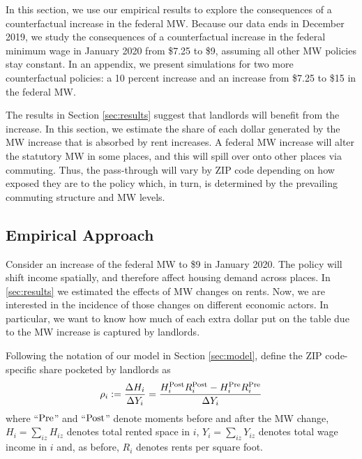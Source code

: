 
In this section, we use our empirical results to explore the consequences of 
a counterfactual increase in the federal MW.
Because our data ends in December 2019, we study the consequences of a 
counterfactual increase in the federal minimum wage in January 2020 from 
\$7.25 to \$9, assuming all other MW policies stay constant. 
In an appendix, we present simulations for two more counterfactual policies: 
a 10 percent increase and an increase from \$7.25 to \$15 in the federal MW.

The results in Section \ref{sec:results} suggest that landlords will benefit
from the increase. 
In this section, we estimate the share of each dollar generated by the MW 
increase that is absorbed by rent increases.
A federal MW increase will alter the statutory MW in some places, and this will
spill over onto other places via commuting.
Thus, the pass-through will vary by ZIP code depending on how exposed they
are to the policy which, in turn, is determined by the prevailing commuting
structure and MW levels.


\subsection{Empirical Approach}\label{sec:emp_cf}

Consider an increase of the federal MW to \$9 in January 2020.
The policy will shift income spatially, and therefore affect housing demand
across places.
In \ref{sec:results} we estimated the effects of MW changes on rents.
Now, we are interested in the incidence of those changes on different economic
actors.
In particular, we want to know how much of each extra dollar put on the table 
due to the MW increase is captured by landlords.

Following the notation of our model in Section \ref{sec:model}, define the 
ZIP code-specific share pocketed by landlords as
\begin{equation*}
    \rho_i := \frac{\Delta H_i}{\Delta Y_i} 
            = \frac{H^{\text{Post}}_i R^{\text{Post}}_i - H^{\text{Pre}}_i R^{\text{Pre}}_i}{\Delta Y_i} 
\end{equation*}
where
``$\text{Pre}$'' and ``$\text{Post}$'' denote moments before and after the MW change,
$H_i = \sum_{iz} H_{iz}$ denotes total rented space in $i$, 
$Y_i = \sum_{iz} Y_{iz}$ denotes total wage income in $i$ 
and, as before,
$R_i$ denotes rents per square foot.

